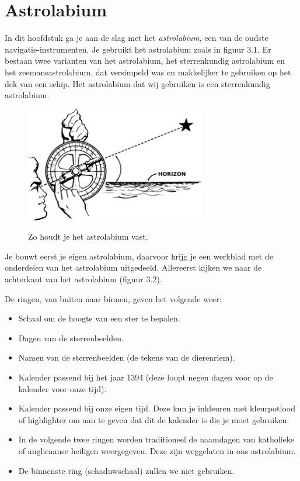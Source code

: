\chapter{Astrolabium}

In dit hoofdstuk ga je aan de slag met het \textit{astrolabium}, een van de oudste navigatie-instrumenten. Je gebruikt het astrolabium zoals in figuur 3.1. Er bestaan twee varianten van het astrolabium, het sterrenkundig astrolabium en het zeemansastrolabium, dat versimpeld was en makkelijker te gebruiken op het dek van een schip. Het astrolabium dat wij gebruiken is een sterrenkundig astrolabium.

\begin{figure}[!b]
\centering
 \includegraphics[width=0.7\textwidth]{astrolabe-hi.png}
 \label{astrolabe-face}
 \caption{Zo houdt je het astrolabium vast.}
\end{figure}

Je bouwt eerst je eigen astrolabium, daarvoor krijg je een werkblad met de onderdelen van het astrolabium uitgedeeld. Allereerst kijken we naar de achterkant van het astrolabium (figuur 3.2).

De ringen, van buiten naar binnen, geven het volgende weer:
\begin{itemize}
 \item Schaal om de hoogte van een ster te bepalen.
 \item Dagen van de sterrenbeelden.
 \item Namen van de sterrenbeelden (de tekens van de dierenriem).
 \item Kalender passend bij het jaar 1394 (deze loopt negen dagen voor op de kalender voor onze tijd).
 \item Kalender passend bij onze eigen tijd. Deze kun je inkleuren met kleurpotlood of highlighter om aan te geven dat dit de kalender is die je moet gebruiken.
 \item In de volgende twee ringen worden traditioneel de naamdagen van katholieke of anglicaanse heiligen weergegeven. Deze zijn weggelaten in ons astrolabium.
 \item De binnenste ring (schaduwschaal) zullen we niet gebruiken.
\end{itemize}

